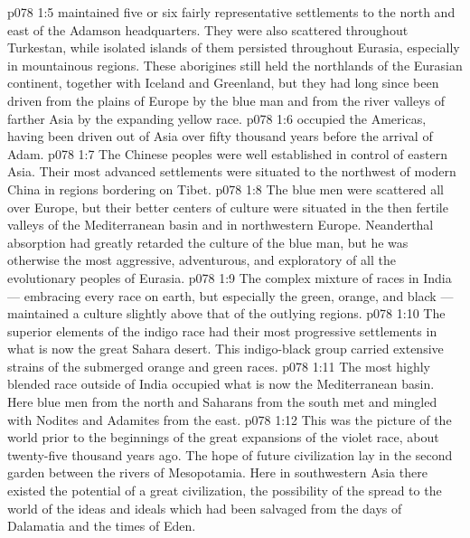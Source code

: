 \vs p078 1:5 \pc {}\bibnobreakspace {} maintained five or six fairly representative settlements to the north and east of the Adamson headquarters. They were also scattered throughout Turkestan, while isolated islands of them persisted throughout Eurasia, especially in mountainous regions. These aborigines still held the northlands of the Eurasian continent, together with Iceland and Greenland, but they had long since been driven from the plains of Europe by the blue man and from the river valleys of farther Asia by the expanding yellow race.
\vs p078 1:6 \pc {}\bibnobreakspace {} occupied the Americas, having been driven out of Asia over fifty thousand years before the arrival of Adam.
\vs p078 1:7 \pc {}\bibnobreakspace {} The Chinese peoples were well established in control of eastern Asia. Their most advanced settlements were situated to the northwest of modern China in regions bordering on Tibet.
\vs p078 1:8 \pc {}\bibnobreakspace {} The blue men were scattered all over Europe, but their better centers of culture were situated in the then fertile valleys of the Mediterranean basin and in northwestern Europe. Neanderthal absorption had greatly retarded the culture of the blue man, but he was otherwise the most aggressive, adventurous, and exploratory of all the evolutionary peoples of Eurasia.
\vs p078 1:9 \pc {}\bibnobreakspace {} The complex mixture of races in India --- embracing every race on earth, but especially the green, orange, and black --- maintained a culture slightly above that of the outlying regions.
\vs p078 1:10 \pc {}\bibnobreakspace {} The superior elements of the indigo race had their most progressive settlements in what is now the great Sahara desert. This indigo\hyp{}black group carried extensive strains of the submerged orange and green races.
\vs p078 1:11 \pc {}\bibnobreakspace {} The most highly blended race outside of India occupied what is now the Mediterranean basin. Here blue men from the north and Saharans from the south met and mingled with Nodites and Adamites from the east.
\vs p078 1:12 \pc This was the picture of the world prior to the beginnings of the great expansions of the violet race, about twenty\hyp{}five thousand years ago. The hope of future civilization lay in the second garden between the rivers of Mesopotamia. Here in southwestern Asia there existed the potential of a great civilization, the possibility of the spread to the world of the ideas and ideals which had been salvaged from the days of Dalamatia and the times of Eden.
